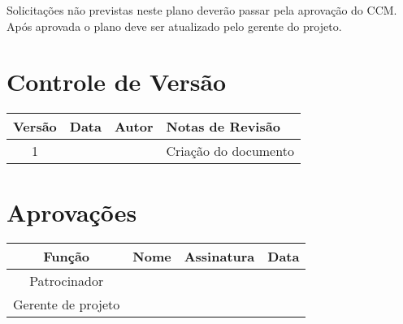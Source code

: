 Solicitações não previstas neste plano deverão passar pela aprovação do CCM. Após aprovada o plano deve ser atualizado pelo gerente do projeto.

\section{Controle de Versão}

\begin{table}[H]
	\begin{tabularx}{\textwidth}{| c | c | X | X |}
		\hline
		\textbf{Versão} & \textbf{Data} & \textbf{Autor}      & \textbf{Notas de Revisão} \\
		\hline
		1                &               & \projectManagerName{} & Criação do documento     \\
		\hline
	\end{tabularx}
	\centering
\end{table}

\section{Aprovações}

\begin{table}[H]
	\begin{tabularx}{\textwidth}{| c | c | X | c |}
		\hline
		\textbf{Função}  & \textbf{Nome}       & \textbf{Assinatura}      & \textbf{Data} \\
		\hline
		Patrocinador       & \projectSponsorName{} & \projectSponsorSignature{} &               \\
		\hline
		Gerente de projeto & \projectManagerName{} & \projectManagerSignature{} &               \\
		\hline
	\end{tabularx}
	\centering
\end{table}